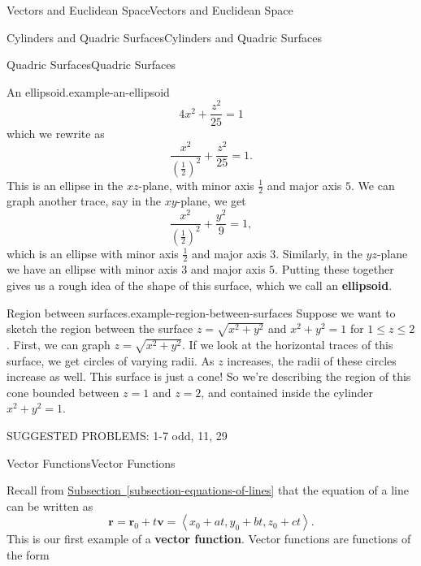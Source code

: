 \documentclass[10pt,]{book}
\newcommand{\terminology}[1]{\textbf{#1}}
\numberwithin{equation}{section}
\newcommand{\vv}[1]{\mathbf{#1}}
\newcommand{\dotprod}[1]{\left\langle #1 \right\rangle}
\begin{document}
\begin{chapterptx}{Vectors and Euclidean Space}{}{Vectors and Euclidean Space}{}{}
\begin{sectionptx}{Cylinders and Quadric Surfaces}{}{Cylinders and Quadric Surfaces}{}{}
\begin{subsectionptx}{Quadric Surfaces}{}{Quadric Surfaces}{}{}
\begin{example}{An ellipsoid.}{example-an-ellipsoid}
\begin{equation*}
4x^{2}+\frac{z^{2}}{25} = 1
\end{equation*}
\hypertarget{p-1028}{}%
which we rewrite as%
%
\begin{equation*}
\frac{x^{2}}{(\frac{1}{2})^{2}}+\frac{z^{2}}{25} = 1.
\end{equation*}
\hypertarget{p-1029}{}%
This is an ellipse in the \(xz\)-plane, with minor axis \(\frac{1}{2}\) and major axis \(5\). We can graph another trace, say in the \(xy\)-plane, we get%
%
\begin{equation*}
\frac{x^{2}}{(\frac{1}{2})^{2}}+\frac{y^{2}}{9} = 1,
\end{equation*}
\hypertarget{p-1030}{}%
which is an ellipse with minor axis \(\frac{1}{2}\) and major axis \(3\). Similarly, in the \(yz\)-plane we have an ellipse with minor axis \(3\) and major axis \(5\). Putting these together gives us a rough idea of the shape of this surface, which we call an \terminology{ellipsoid}.%
\end{example}
\begin{example}{Region between surfaces.}{example-region-between-surfaces}%
\hypertarget{p-1031}{}%
Suppose we want to sketch the region between the surface \(z=\sqrt{x^{2}+y^{2}}\) and \(x^{2}+y^{2}=1\) for \(1\leq z\leq 2\). First, we can graph \(z=\sqrt{x^{2}+y^{2}}\). If we look at the horizontal traces of this surface, we get circles of varying radii. As \(z\) increases, the radii of these circles increase as well. This surface is just a cone! So we're describing the region of this cone bounded between \(z=1\) and \(z=2\), and contained inside the cylinder \(x^{2}+y^{2}=1\).%
\end{example}
\hypertarget{p-1032}{}%
SUGGESTED PROBLEMS: 1-7 odd, 11, 29%
\end{subsectionptx}
\end{sectionptx}
%
%
\typeout{************************************************}
\typeout{************************************************}
%
\begin{sectionptx}{Vector Functions}{}{Vector Functions}{}{}\label{section-vector-functions}
\begin{introduction}{}%
\hypertarget{p-1033}{}%
Recall from \hyperref[subsection-equations-of-lines]{Subsection~\ref{subsection-equations-of-lines}} that the equation of a line can be written as%
\begin{equation*}
\vv{r} = \vv{r}_{0}+t\vv{v} = \dotprod{x_{0}+at, y_{0}+bt, z_{0}+ct}.
\end{equation*}
This is our first example of a \terminology{vector function}. Vector functions are functions of the form%

\end{introduction}
\end{sectionptx}
\end{chapterptx}
\end{document}
